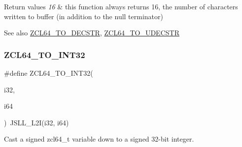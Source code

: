 \begin{DoxyRetVals}{Return values}
{\em 16} & this function always returns 16, the number of characters written to {\ttfamily buffer} (in addition to the null terminator)\\
\hline
\end{DoxyRetVals}
\begin{DoxySeeAlso}{See also}
\hyperlink{group__zcl__64_gae93bf21431b64dcc3d9bcd67296ff0ed}{Z\+C\+L64\+\_\+\+T\+O\+\_\+\+D\+E\+C\+S\+TR}, \hyperlink{group__zcl__64_gae094f7c19dcfd18917b426a9e43aa427}{Z\+C\+L64\+\_\+\+T\+O\+\_\+\+U\+D\+E\+C\+S\+TR} 
\end{DoxySeeAlso}
\mbox{\label{group__zcl__64_gaceb8fdf41f4dc532f6028bab90521d3e}} 
\subsubsection{\texorpdfstring{Z\+C\+L64\+\_\+\+T\+O\+\_\+\+I\+N\+T32}{ZCL64\_TO\_INT32}}
{\footnotesize\ttfamily \#define Z\+C\+L64\+\_\+\+T\+O\+\_\+\+I\+N\+T32(\begin{DoxyParamCaption}\item[{}]{i32,  }\item[{}]{i64 }\end{DoxyParamCaption})~J\+S\+L\+L\+\_\+\+L2I(i32, i64)}



Cast a signed zcl64\+\_\+t variable down to a signed 32-\/bit integer. 


